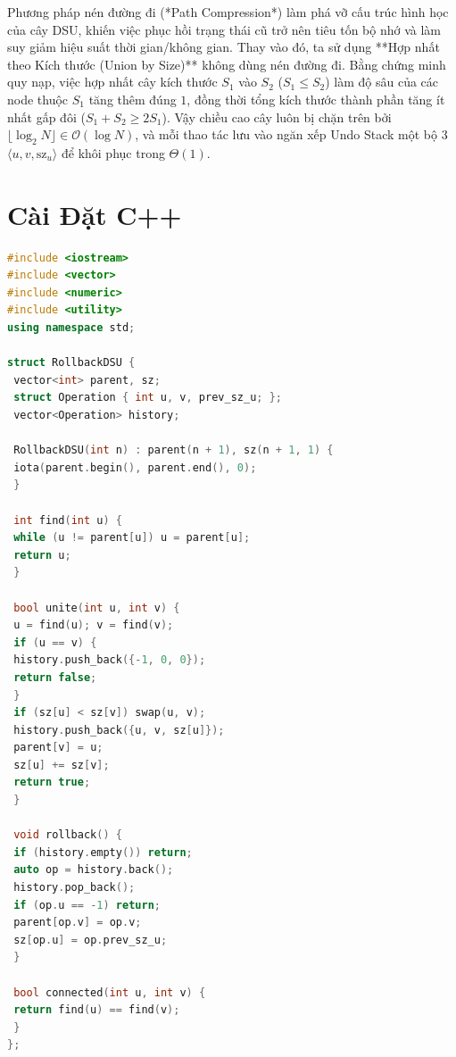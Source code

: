 \documentclass[11pt, letterpaper]{report}
\begin{document}
Phương pháp nén đường đi (*Path Compression*) làm phá vỡ cấu trúc hình học của cây DSU, khiến việc phục hồi trạng thái cũ trở nên tiêu tốn bộ nhớ và làm suy giảm hiệu suất thời gian/không gian. Thay vào đó, ta sử dụng **Hợp nhất theo Kích thước (Union by Size)** không dùng nén đường đi. Bằng chứng minh quy nạp, việc hợp nhất cây kích thước $S_1$ vào $S_2$ ($S_1 \le S_2$) làm độ sâu của các node thuộc $S_1$ tăng thêm đúng $1$, đồng thời tổng kích thước thành phần tăng ít nhất gấp đôi ($S_1 + S_2 \ge 2S_1$). Vậy chiều cao cây luôn bị chặn trên bởi $\lfloor \log_2 N \rfloor \in \mathcal{O}(\log N)$, và mỗi thao tác lưu vào ngăn xếp Undo Stack một bộ 3 $\langle u, v, \text{sz}_u \rangle$ để khôi phục trong $\Theta(1)$.

\section{Cài Đặt C++}
\begin{lstlisting}[language=C++, caption={Rollback DSU C++ Engine}]
#include <iostream>
#include <vector>
#include <numeric>
#include <utility>
using namespace std;

struct RollbackDSU {
 vector<int> parent, sz;
 struct Operation { int u, v, prev_sz_u; };
 vector<Operation> history;

 RollbackDSU(int n) : parent(n + 1), sz(n + 1, 1) {
 iota(parent.begin(), parent.end(), 0);
 }

 int find(int u) {
 while (u != parent[u]) u = parent[u];
 return u;
 }

 bool unite(int u, int v) {
 u = find(u); v = find(v);
 if (u == v) {
 history.push_back({-1, 0, 0});
 return false;
 }
 if (sz[u] < sz[v]) swap(u, v);
 history.push_back({u, v, sz[u]});
 parent[v] = u;
 sz[u] += sz[v];
 return true;
 }

 void rollback() {
 if (history.empty()) return;
 auto op = history.back();
 history.pop_back();
 if (op.u == -1) return;
 parent[op.v] = op.v;
 sz[op.u] = op.prev_sz_u;
 }

 bool connected(int u, int v) {
 return find(u) == find(v);
 }
};
\end{lstlisting}
\end{document}
